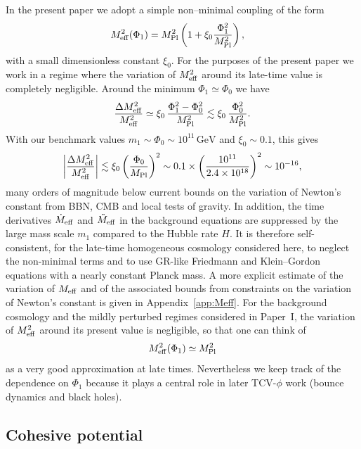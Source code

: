 \documentclass[aps,prd,onecolumn,nofootinbib,superscriptaddress]{revtex4-2}
\newcommand{\Mpl}{M_{\rm Pl}}
\newcommand{\Meff}{M_{\rm eff}}
\begin{document}
In the present paper we adopt a simple non--minimal coupling of the form
\begin{align}
  \Meff^2(\Phi_1)
  &=
  \Mpl^2\left( 1 + \xi_0 \frac{\Phi_1^2}{\Mpl^2} \right),
  \label{eq:Meff}
\end{align}
with a small dimensionless constant $\xi_0$.
For the purposes of the present paper we work in a regime where the variation of $\Meff^2$ around its late-time value is completely negligible. Around the minimum $\Phi_1 \simeq \Phi_0$ we have
\begin{equation}
  \frac{\Delta \Meff^2}{\Meff^2}
  \simeq \xi_0\,\frac{\Phi_1^2 - \Phi_0^2}{\Mpl^2}
  \lesssim \xi_0\,\frac{\Phi_0^2}{\Mpl^2}.
\end{equation}
With our benchmark values $m_1 \sim \Phi_0 \sim 10^{11}\,\mathrm{GeV}$ and $\xi_0 \sim 0.1$, this gives
\begin{equation}
  \left|\frac{\Delta \Meff^2}{\Meff^2}\right|
  \lesssim \xi_0 \left(\frac{\Phi_0}{\Mpl}\right)^2
  \sim 0.1 \times \left(\frac{10^{11}}{2.4\times 10^{18}}\right)^2
  \sim 10^{-16},
\end{equation}
many orders of magnitude below current bounds on the variation of Newton's constant from BBN, CMB and local tests of gravity. In addition, the time derivatives $\dot \Meff$ and $\ddot \Meff$ in the background equations are suppressed by the large mass scale $m_1$ compared to the Hubble rate $H$. It is therefore self-consistent, for the late-time homogeneous cosmology considered here, to neglect the non-minimal terms and to use GR-like Friedmann and Klein--Gordon equations with a nearly constant Planck mass. A more explicit estimate of the variation of $M_{\rm eff}$ and of the associated bounds from constraints on the variation of Newton's constant is given in Appendix~\ref{app:Meff}.
For the background cosmology and the mildly perturbed regimes considered in Paper~I, the variation of $\Meff^2$ around its present value is negligible, so that one can think of
\begin{equation}
  \Meff^2(\Phi_1) \simeq \Mpl^2
\end{equation}
as a very good approximation at late times.
Nevertheless we keep track of the dependence on $\Phi_1$ because it plays a central role in later TCV-$\phi$ work (bounce dynamics and black holes).

\subsection{Cohesive potential}
\end{document}
